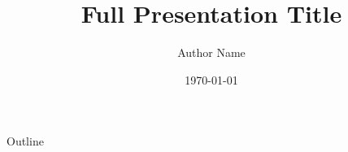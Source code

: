 \documentclass[10pt,aspectratio=169]{beamer}
\title[Short Title]{Full Presentation Title}
\author{Author Name}
\institute{Institution}
\date{\today}
\begin{document}
\begin{frame}
\titlepage
\end{frame}

\begin{frame}{Outline}
\tableofcontents
\end{frame}



% 
% 


\end{document}
